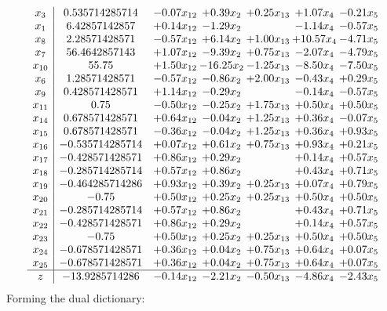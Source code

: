 \documentclass[8pt]{article}
\begin{document}
\[\begin{array}{c| c c@{\hskip 2pt} c@{\hskip 2pt} c@{\hskip 2pt} c@{\hskip 2pt} c@{\hskip 2pt} }
 x_{3}   &  0.535714285714 & -0.07 x_{12} & +  0.39 x_{2} & +  0.25 x_{13} & +  1.07 x_{4} & -0.21 x_{5}\\
 x_{1}   &  6.42857142857 & +  0.14 x_{12} & -1.29 x_{2} &   & -1.14 x_{4} & -0.57 x_{5}\\
 x_{8}   &  2.28571428571 & -0.57 x_{12} & +  6.14 x_{2} & +  1.00 x_{13} & + 10.57 x_{4} & -4.71 x_{5}\\
 x_{7}   &  56.4642857143 & +  1.07 x_{12} & -9.39 x_{2} & +  0.75 x_{13} & -2.07 x_{4} & -4.79 x_{5}\\
 x_{10}   &  55.75 & +  1.50 x_{12} & -16.25 x_{2} & -1.25 x_{13} & -8.50 x_{4} & -7.50 x_{5}\\
 x_{6}   &  1.28571428571 & -0.57 x_{12} & -0.86 x_{2} & +  2.00 x_{13} & -0.43 x_{4} & +  0.29 x_{5}\\
 x_{9}   &  0.428571428571 & +  1.14 x_{12} & -0.29 x_{2} &   & -0.14 x_{4} & -0.57 x_{5}\\
 x_{11}   &  0.75 & -0.50 x_{12} & -0.25 x_{2} & +  1.75 x_{13} & +  0.50 x_{4} & +  0.50 x_{5}\\
 x_{14}   &  0.678571428571 & +  0.64 x_{12} & -0.04 x_{2} & +  1.25 x_{13} & +  0.36 x_{4} & -0.07 x_{5}\\
 x_{15}   &  0.678571428571 & -0.36 x_{12} & -0.04 x_{2} & +  1.25 x_{13} & +  0.36 x_{4} & +  0.93 x_{5}\\
 x_{16}   &  -0.535714285714 & +  0.07 x_{12} & +  0.61 x_{2} & +  0.75 x_{13} & +  0.93 x_{4} & +  0.21 x_{5}\\
 x_{17}   &  -0.428571428571 & +  0.86 x_{12} & +  0.29 x_{2} &   & +  0.14 x_{4} & +  0.57 x_{5}\\
 x_{18}   &  -0.285714285714 & +  0.57 x_{12} & +  0.86 x_{2} &   & +  0.43 x_{4} & +  0.71 x_{5}\\
 x_{19}   &  -0.464285714286 & +  0.93 x_{12} & +  0.39 x_{2} & +  0.25 x_{13} & +  0.07 x_{4} & +  0.79 x_{5}\\
 x_{20}   &  -0.75 & +  0.50 x_{12} & +  0.25 x_{2} & +  0.25 x_{13} & +  0.50 x_{4} & +  0.50 x_{5}\\
 x_{21}   &  -0.285714285714 & +  0.57 x_{12} & +  0.86 x_{2} &   & +  0.43 x_{4} & +  0.71 x_{5}\\
 x_{22}   &  -0.428571428571 & +  0.86 x_{12} & +  0.29 x_{2} &   & +  0.14 x_{4} & +  0.57 x_{5}\\
 x_{23}   &  -0.75 & +  0.50 x_{12} & +  0.25 x_{2} & +  0.25 x_{13} & +  0.50 x_{4} & +  0.50 x_{5}\\
 x_{24}   &  -0.678571428571 & +  0.36 x_{12} & +  0.04 x_{2} & +  0.75 x_{13} & +  0.64 x_{4} & +  0.07 x_{5}\\
 x_{25}   &  -0.678571428571 & +  0.36 x_{12} & +  0.04 x_{2} & +  0.75 x_{13} & +  0.64 x_{4} & +  0.07 x_{5}\\
\hline
z    &  -13.9285714286 & -0.14 x_{12} & -2.21 x_{2} & -0.50 x_{13} & -4.86 x_{4} & -2.43 x_{5}\\
\end{array}\]
Forming the dual dictionary:
\end{document}
